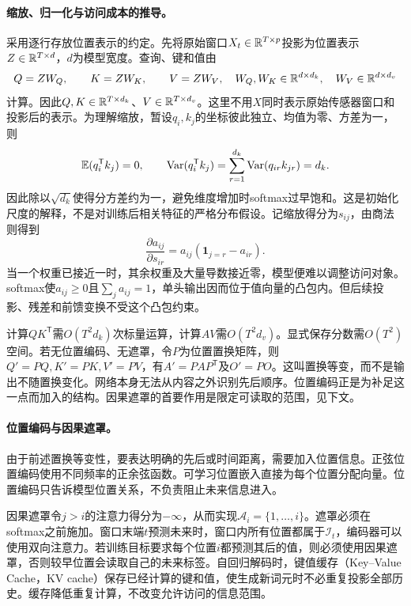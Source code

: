 \paragraph{缩放、归一化与访问成本的推导。}
采用逐行存放位置表示的约定。先将原始窗口$X_t\in\mathbb{R}^{T\times p}$投影为位置表示$Z\in\mathbb{R}^{T\times d}$，$d$为模型宽度。查询、键和值由
\begin{equation}
 Q=ZW_Q,\qquad K=ZW_K,\qquad V=ZW_V,
 \quad W_Q,W_K\in\mathbb{R}^{d\times d_k},\quad W_V\in\mathbb{R}^{d\times d_v}
\end{equation}
计算。因此$Q,K\in\mathbb{R}^{T\times d_k}$、$V\in\mathbb{R}^{T\times d_v}$。这里不用$X$同时表示原始传感器窗口和投影后的表示。为理解缩放，暂设$q_i,k_j$的坐标彼此独立、均值为零、方差为一，则
\begin{equation}
 \mathbb{E}(q_i^{\mathsf T}k_j)=0,\qquad
 \operatorname{Var}(q_i^{\mathsf T}k_j)=\sum_{r=1}^{d_k}\operatorname{Var}(q_{ir}k_{jr})=d_k.
\end{equation}
因此除以$\sqrt{d_k}$使得分方差约为一，避免维度增加时softmax过早饱和。这是初始化尺度的解释，不是对训练后相关特征的严格分布假设。记缩放得分为$s_{ij}$，由商法则得到
\begin{equation}
 \frac{\partial a_{ij}}{\partial s_{ir}}=a_{ij}(\mathbf1_{j=r}-a_{ir}).
\end{equation}
当一个权重已接近一时，其余权重及大量导数接近零，模型便难以调整访问对象。softmax使$a_{ij}\geq0$且$\sum_j a_{ij}=1$，单头输出因而位于值向量的凸包内。但后续投影、残差和前馈变换不受这个凸包约束。

计算$QK^{\mathsf T}$需$O(T^2d_k)$次标量运算，计算$AV$需$O(T^2d_v)$。显式保存分数需$O(T^2)$空间。若无位置编码、无遮罩，令$P$为位置置换矩阵，则$Q'=PQ,K'=PK,V'=PV$，有$A'=PAP^{\mathsf T}$及$O'=PO$。这叫置换等变，而不是输出不随置换变化。网络本身无法从内容之外识别先后顺序。位置编码正是为补足这一点而加入的结构。因果遮罩的首要作用是限定可读取的范围，见下文。

\paragraph{位置编码与因果遮罩。}
由于前述置换等变性，要表达明确的先后或时间距离，需要加入位置信息。正弦位置编码使用不同频率的正余弦函数。可学习位置嵌入直接为每个位置分配向量。位置编码只告诉模型位置关系，不负责阻止未来信息进入。

因果遮罩令$j>i$的注意力得分为$-\infty$，从而实现$\mathcal A_i=\{1,\ldots,i\}$。遮罩必须在softmax之前施加。窗口末端$t$预测未来时，窗口内所有位置都属于$\mathcal I_t$，编码器可以使用双向注意力。若训练目标要求每个位置$i$都预测其后的值，则必须使用因果遮罩，否则较早位置会读取自己的未来标签。自回归解码时，键值缓存（Key--Value Cache，KV cache）保存已经计算的键和值，使生成新词元时不必重复投影全部历史。缓存降低重复计算，不改变允许访问的信息范围。

